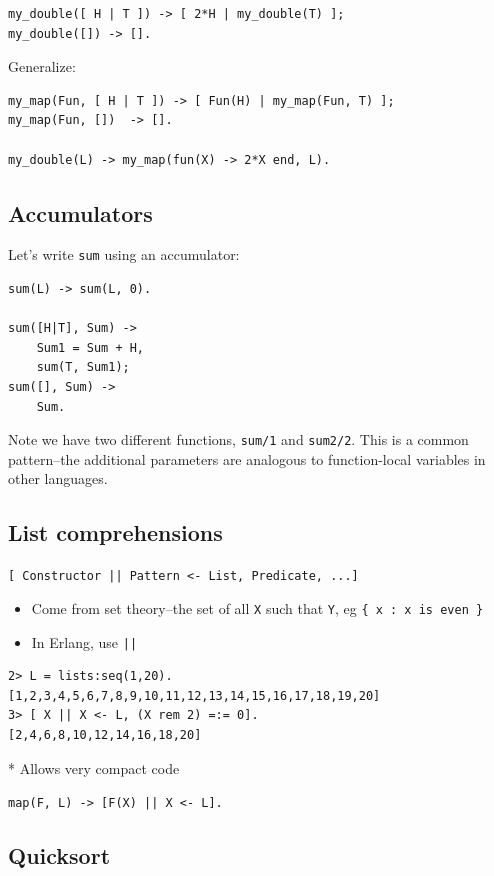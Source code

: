 \documentclass[12pt]{article}
\begin{document}
\begin{verbatim}
my_double([ H | T ]) -> [ 2*H | my_double(T) ];
my_double([]) -> [].
\end{verbatim}

Generalize:

\begin{verbatim}
my_map(Fun, [ H | T ]) -> [ Fun(H) | my_map(Fun, T) ];
my_map(Fun, [])  -> [].

my_double(L) -> my_map(fun(X) -> 2*X end, L).
\end{verbatim}

\subsection{Accumulators}

Let's write \verb+sum+ using an accumulator:

\begin{verbatim}
sum(L) -> sum(L, 0).

sum([H|T], Sum) -> 
    Sum1 = Sum + H,
    sum(T, Sum1);
sum([], Sum) ->
    Sum.
\end{verbatim}

Note we have two different functions, \verb+sum/1+ and
\verb+sum2/2+. This is a common pattern--the additional parameters are
analogous to function-local variables in other languages.

\subsection{List comprehensions}


\verb+[ Constructor || Pattern <- List, Predicate, ...]+ 


\begin{itemize}
\item Come from set theory--the set of all \verb+X+ such that \verb+Y+, 
eg \verb+{ x : x is even }+
\item In Erlang, use \verb+||+
\end{itemize}

\begin{verbatim}
2> L = lists:seq(1,20).
[1,2,3,4,5,6,7,8,9,10,11,12,13,14,15,16,17,18,19,20]
3> [ X || X <- L, (X rem 2) =:= 0].
[2,4,6,8,10,12,14,16,18,20]
\end{verbatim}

* Allows very compact code

\verb+map(F, L) -> [F(X) || X <- L].+

\subsection{Quicksort}
\end{document}
